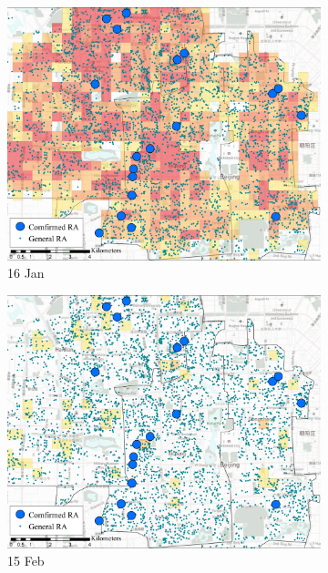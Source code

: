 \documentclass[preprints,article,accept,moreauthors,pdftex]{Definitions/mdpi}
\begin{document}
\begin{figure}[H]
    \centering
    \begin{subfigure}{.32\textwidth}
        \includegraphics[width=\textwidth]{Figures/Relation_with_POIs/POIsRAD2020_01_16.pdf}
        \caption{16 Jan}
    \end{subfigure}
    \begin{subfigure}{.32\textwidth}
        \includegraphics[width=\textwidth]{Figures/Relation_with_POIs/POIsRAD2020_02_15.pdf}
        \caption{15 Feb}
    \end{subfigure}
    \begin{subfigure}{.32\textwidth}

\end{subfigure}
\end{figure}
\end{document}
